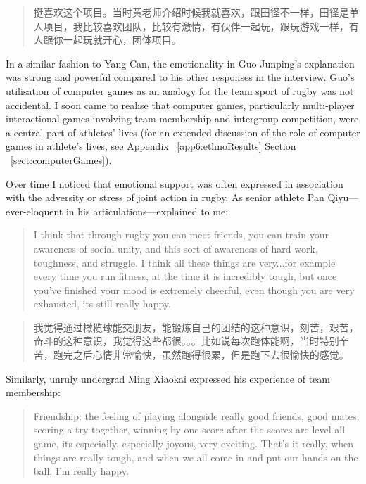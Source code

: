 \begin{CJK}{UTF8}{gbsn}
  \begin{quote}
    	挺喜欢这个项目。当时黄老师介绍时候我就喜欢，跟田径不一样，田径是单人项目，我比较喜欢团队，比较有激情，有伙伴一起玩，跟玩游戏一样，有人跟你一起玩就开心，团体项目。
  \end{quote}

In a similar fashion to Yang Can, the emotionality in Guo Junping's explanation was strong and powerful compared to his other responses in the interview.  Guo's utilisation of computer games as an analogy for the team sport of rugby was not accidental. I soon came to realise that computer games, particularly multi-player interactional games involving team membership and intergroup competition,  were a central part of athletes' lives (for an extended discussion of the role of computer games in athlete's lives, see Appendix ~\ref{app6:ethnoResults} Section ~\ref{sect:computerGames}).

Over time I noticed that emotional support was often expressed in association with the adversity or stress of joint action in rugby.
As senior athlete Pan Qiyu---ever-eloquent in his articulations---explained to me:

    \begin{quote}
      I think that through rugby you can meet friends, you can train your awareness of social unity, and this sort of awareness of hard work, toughness, and struggle.  I think all these things are very...for example every time you run fitness, at the time it is incredibly tough, but once you’ve finished your mood is extremely cheerful, even though you are very exhausted, its still really happy.
    \end{quote}

    \begin{quote}
      我觉得通过橄榄球能交朋友，能锻炼自己的团结的这种意识，刻苦，艰苦，奋斗的这种意识，我觉得这些都很。。。比如说每次跑体能啊，当时特别辛苦，跑完之后心情非常愉快，虽然跑得很累，但是跑下去很愉快的感觉。 
    \end{quote}

Similarly, unruly undergrad Ming Xiaokai expressed his experience of team membership:

    \begin{quote}
      Friendship: the feeling of playing alongside really good friends, good mates, scoring a try together, winning by one score after the scores are level all game, its especially, especially joyous, very exciting.  That's it really, when things are really tough, and when we all come in and put our hands on the ball, I’m really happy.
    \end{quote}


\end{CJK}
